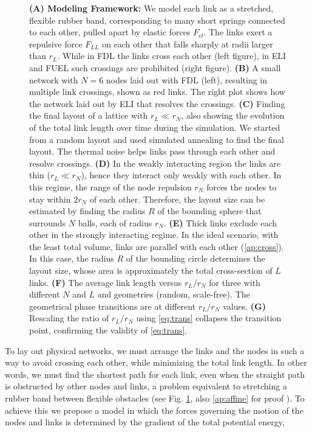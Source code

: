 \documentclass[linenumbers,endfloats,nofootinbib,preprint,floatfix,titlepage,superscriptaddress]{revtex4-1} %
\begin{document}
\begin{figure}
    \caption{
    \scriptsize
    {\bf(A) Modeling Framework:} We model each link as a stretched, flexible rubber band, 
    corresponding to many short springs connected to each other, pulled apart by
    elastic forces $F_{el}$. 
    The links exert a repulsive force $F_{LL}$  on each other that falls sharply at radii larger than $r_L$. 
    While in FDL the links cross each other (left figure), in ELI and FUEL such crossings are prohibited (right figure). 
    {\bf(B)} A small network with $N=6$ nodes laid out with FDL (left), resulting in multiple link crossings, shown as red links.   
    The right plot shows how the network laid out by ELI that resolves the crossings.
    {\bf (C)} Finding the final layout of a lattice with $r_L\ll r_N$, also showing the evolution of the total link length over time during the simulation. 
    We started from a random layout and used simulated annealing to find the final layout.
    The thermal noise helps links pass through each other and resolve crossings.
    {\bf (D)} In the weakly interacting region the links are thin ($r_L\ll r_N$), hence they interact only weakly with each other. 
    In this regime, the range of the node repulsion $r_N$ forces the nodes to stay within $2r_N$ of each other. 
    Therefore, the layout size can be estimated by finding the radius $R$ of the bounding sphere that surrounds $N$ balls, each of radius $r_N$. 
    {\bf (E)} Thick links exclude each other  in the strongly interacting regime. 
    In the ideal scenario, with the least total volume, links are parallel with each other (\ref{ap:cross}). 
    In this case, the radius $R$ of the bounding circle determines the layout size, whose area is approximately the total cross-section of $L$ links. 
    {\bf (F)} The average link length versus $r_L/r_N$ for three with different $N$ and $L$ and geometries (random, scale-free). 
    The geometrical phase transitions are at different $r_L/r_N$ values. 
    {\bf (G)} Rescaling the ratio of $r_L/r_N$ using \eqref{eq:trans}  collapses the transition point, %
    confirming the validity of \eqref{eq:trans}. 
    \vspace{-1cm}}
    \label{fig:trans}
    \label{fig:crs-lat}
\end{figure}
\begin{linenumbers}
To lay out physical networks, we must arrange the links and the nodes in such a way to avoid crossing each other, while minimizing the total link length. 
In other words, we must find the shortest path for each link, even when the straight path is obstructed by other nodes and links, a problem equivalent to stretching a rubber band between flexible obstacles (see Fig. \ref{fig:crs-lat}, also \ref{ap:affine} for proof \cite{novikov1984}). 
To achieve this we propose a model in which the forces governing the motion of the nodes and links is determined by the gradient of the total potential energy,
\end{linenumbers}
\end{document}
